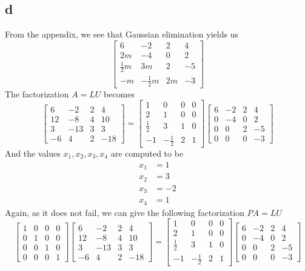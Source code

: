 \documentclass[12pt]{article}
\begin{document}
\subsection*{d}
From the appendix, we see that Gaussian elimination yields us
$$
\begin{bmatrix}
6 & -2 & 2 & 4\\
2m & -4 & 0 & 2 \\
\frac{1}{2}m & 3m & 2 & -5 \\
-m & -\frac{1}{2}m & 2m & -3
\end{bmatrix}
$$
The factorization $A=LU$ becomes
$$
\begin{bmatrix}
6 & -2 & 2 & 4\\
12 & -8 & 4 & 10 \\
3 & -13 & 3 & 3 \\
-6 & 4 & 2 & -18
\end{bmatrix}
=
\begin{bmatrix}
1 & 0 & 0 & 0\\
2 & 1 & 0 & 0 \\
\frac{1}{2} & 3 & 1 & 0 \\
-1 & -\frac{1}{2} & 2 & 1
\end{bmatrix}
\begin{bmatrix}
6 & -2 & 2 & 4\\
0 & -4 & 0 & 2 \\
0 & 0 & 2 & -5 \\
0 & 0 & 0 & -3
\end{bmatrix}
$$
And the values $x_1,x_2,x_3,x_4$ are computed to be
\begin{align*}
x_1&=1 \\
x_2&=3 \\
x_3&=-2 \\
x_4&=1
\end{align*}
Again, as it does not fail, we can give the following factorization $PA=LU$
$$
\begin{bmatrix}
1 & 0 & 0 & 0\\
0 & 1 & 0 & 0 \\
0 & 0 & 1 & 0 \\
0 & 0 & 0 & 1
\end{bmatrix}
\begin{bmatrix}
6 & -2 & 2 & 4\\
12 & -8 & 4 & 10 \\
3 & -13 & 3 & 3 \\
-6 & 4 & 2 & -18
\end{bmatrix}
=
\begin{bmatrix}
1 & 0 & 0 & 0\\
2 & 1 & 0 & 0 \\
\frac{1}{2} & 3 & 1 & 0 \\
-1 & -\frac{1}{2} & 2 & 1
\end{bmatrix}
\begin{bmatrix}
6 & -2 & 2 & 4\\
0 & -4 & 0 & 2 \\
0 & 0 & 2 & -5 \\
0 & 0 & 0 & -3
\end{bmatrix}
$$
\end{document}
